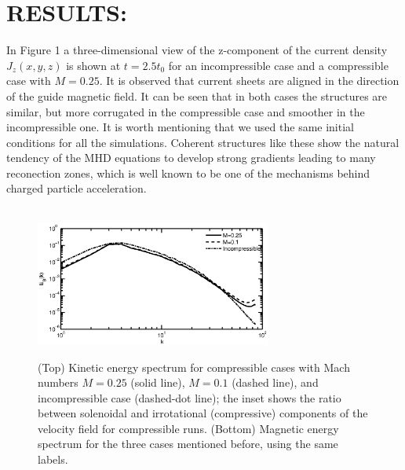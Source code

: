 \documentclass[%
aip,pop,amsmath,amssymb,
 reprint,%
]{revtex4-1}
\begin{document}
\section{\label{sec:level3}RESULTS:}

In Figure 1 a three-dimensional view of the z-component of the current density $J_z(x,y,z)$ is shown at $t=2.5t_0$ for an incompressible case and a compressible case with $M=0.25$. It is observed that current sheets are aligned in the direction of the guide magnetic field. 
It can be seen that in both cases the structures are similar,
but more corrugated in the compressible case and smoother in the incompressible one. It is worth mentioning that we used the same 
initial conditions for all the simulations. Coherent structures like
these show the natural tendency of the MHD equations to develop strong gradients leading
to many reconection zones, which is well known to be one of the mechanisms behind
charged particle acceleration.

\begin{figure}[<h!>]
\begin{center}
\\
{\includegraphics[width = 3.05in]{./Figures/Fig2_b}}\\
\caption{(Top) Kinetic energy spectrum for compressible cases with Mach 
numbers $M=0.25$ (solid line), $M=0.1$ (dashed line), and incompressible case 
(dashed-dot line); the inset shows the ratio between solenoidal
and irrotational (compressive) 
components of the velocity field for compressible runs. (Bottom) Magnetic energy spectrum
for the three cases mentioned before, using the same labels.}
\end{center}
\label{mean square velocity}
\end{figure}
\end{document}
